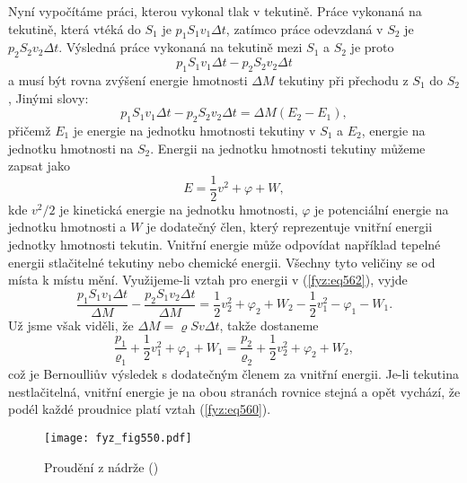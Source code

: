     Nyní vypočítáme práci, kterou vykonal tlak v tekutině. Práce vykonaná na tekutině, která vtéká 
    do \(S_1\) je \(p_1S_1v_1\Delta t\), zatímco práce odevzdaná v \(S_2\) je \(p_2S_2v_2\Delta 
    t\). Výsledná práce vykonaná na tekutině mezi \(S_1\) a \(S_2\) je proto
    \begin{equation*}
      p_1S_1v_1\Delta t - p_2S_2v_2\Delta t
    \end{equation*}
    a musí být rovna zvýšení energie hmotnosti \(\Delta M\) tekutiny při přechodu z \(S_1\) do 
    \(S_2\), Jinými slovy:
    \begin{equation}\label{fyz:eq562}
      p_1S_1v_1\Delta t - p_2S_2v_2\Delta t = \Delta M(E_2 - E_1),
    \end{equation}
    přičemž \(E_1\) je energie na jednotku hmotnosti tekutiny v \(S_1\) a \(E_2\), energie na 
    jednotku hmotnosti na \(S_2\). Energii na jednotku hmotnosti tekutiny můžeme zapsat jako
    \begin{equation*}
      E = \dfrac{1}{2}v^2 + \varphi + W,
    \end{equation*}
    kde \(v^2/2\) je kinetická energie na jednotku hmotnosti, \(\varphi\) je potenciální energie na 
    jednotku hmotnosti a \(W\) je dodatečný člen, který reprezentuje vnitřní energii jednotky 
    hmotnosti tekutin. Vnitřní energie může odpovídat například tepelné energii stlačitelné 
    tekutiny nebo chemické energii. Všechny tyto veličiny se od místa k místu mění. Využijeme-li 
    vztah pro energii v (\ref{fyz:eq562}), vyjde
    \begin{equation*}
      \dfrac{p_1S_1v_1\Delta t}{\Delta M} - \dfrac{p_2S_1v_2\Delta t}{\Delta M} = 
        \dfrac{1}{2}v_2^2 + \varphi_2 + W_2 - \dfrac{1}{2}v_1^2 - \varphi_1 - W_1.
    \end{equation*}
    Už jsme však viděli, že \(\Delta M= \varrho Sv\Delta t\), takže dostaneme
    \begin{equation}\label{fyz:eq563}
      \dfrac{p_1}{\varrho_1} + \dfrac{1}{2}v_1^2 + \varphi_1 + W_1 
        = \dfrac{p_2}{\varrho_2} + \dfrac{1}{2}v_2^2 + \varphi_2 + W_2,
    \end{equation}
    což je Bernoulliův výsledek s dodatečným členem za vnitřní energii. Je-li tekutina 
    nestlačitelná, vnitřní energie je na obou stranách rovnice stejná a opět vychází, že podél 
    každé proudnice platí vztah (\ref{fyz:eq560}).
    
    \begin{figure}[ht!] %
      \centering
      \texttt{[image: fyz\_fig550.pdf]}
      \caption{Proudění z nádrže
               (\cite[s.~749]{Feynman02})}
      \label{fyz:fig550}
    \end{figure}

